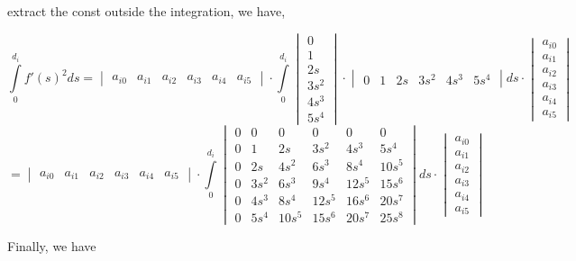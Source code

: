 \documentclass[a4paper,11pt]{article}  %
\begin{document}
extract the const outside the integration, we have,

$$
\int\limits_{0}^{d_i} f'(s)^2 ds =
\begin{vmatrix} a_{i0} & a_{i1} & a_{i2} & a_{i3} & a_{i4} & a_{i5} \end{vmatrix} 
\cdot 
\int\limits_{0}^{d_i}  
\begin{vmatrix} 0 \\ 1 \\ 2s \\ 3s^2 \\ 4s^3 \\ 5s^4 \end{vmatrix} 
\cdot 
\begin{vmatrix} 0 & 1 & 2s & 3s^2 & 4s^3 & 5s^4 \end{vmatrix} ds 
\cdot 
\begin{vmatrix} a_{i0} \\ a_{i1} \\ a_{i2} \\ a_{i3} \\ a_{i4} \\ a_{i5}  \end{vmatrix}
$$
$$
=\begin{vmatrix} a_{i0} & a_{i1} & a_{i2} & a_{i3} & a_{i4} & a_{i5} \end{vmatrix} 
\cdot \int\limits_{0}^{d_i}
\begin{vmatrix} 
0  & 0 &0&0&0&0\\ 
0 & 1 & 2s & 3s^2 & 4s^3 & 5s^4\\
0 & 2s & 4s^2 & 6s^3 & 8s^4 & 10s^5\\
0 & 3s^2 &  6s^3 & 9s^4 & 12s^5&15s^6 \\
0 & 4s^3 & 8s^4 &12s^5 &16s^6&20s^7 \\
0 & 5s^4 & 10s^5 & 15s^6 & 20s^7 & 25s^8 
\end{vmatrix} ds 
\cdot 
\begin{vmatrix} a_{i0} \\ a_{i1} \\ a_{i2} \\ a_{i3} \\ a_{i4} \\ a_{i5} \end{vmatrix}
$$


Finally, we have
\end{document}
